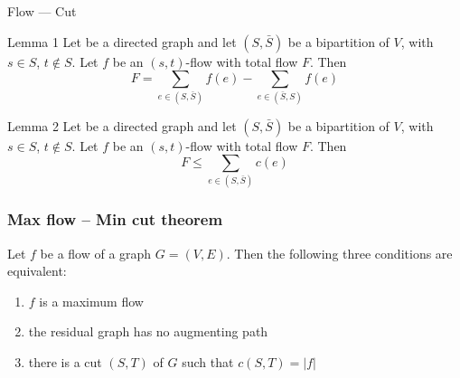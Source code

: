 \begin{frame}[fragile]{Flow --- Cut}

	\begin{block}{Lemma 1}
	Let \g be a directed graph and
let $(S, \bar{S})$ be a bipartition of $V$, with $s\in S$, $t\notin S$.
Let $f$ be an $(s,t)$-flow with total flow $F$.
Then
	\begin{equation*}
F = \sum_{e\in (S, \bar{S})} f(e) -  \sum_{e\in (\bar{S}, S)} f(e)
\end{equation*}
\end{block}

\begin{block}{Lemma 2}
	Let \g be a directed graph and
let $(S, \bar{S})$ be a bipartition of $V$, with $s\in S$, $t\notin S$.
Let $f$ be an $(s,t)$-flow with total flow $F$.
Then
	\begin{equation*}
F \le \sum_{e\in (S, \bar{S})} c(e)
\end{equation*}
\end{block}
\end{frame}

\begin{frame}[fragile]
	\frametitle{Max flow -- Min cut theorem}

	Let \(f\) be a flow of a graph \(G=(V,E)\).
	Then the following three conditions are equivalent:

	\begin{enumerate}
		\item
		      \(f\) is a maximum flow
		\item
		      the residual graph has no \alert{augmenting} path
		\item
		      there is a cut \((S,T)\) of \(G\) such that \(c(S,T) = |f|\)
	\end{enumerate}
	\end{frame}


